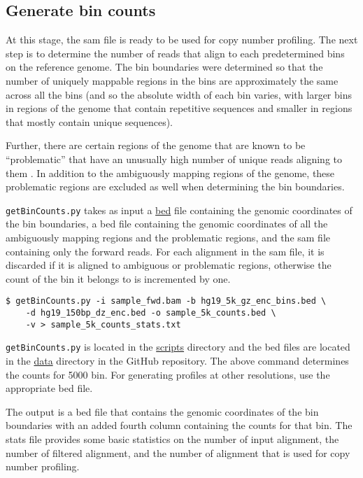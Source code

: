 \documentclass[11pt]{article}
\newcommand{\prog}[1]{\texttt{#1}}
\begin{document}
\subsection{Generate bin counts}
At this stage, the sam file is ready to be used for copy number
profiling.  The next step is to determine the number of reads that align
to each predetermined bins on the reference genome.
The bin boundaries were determined so that the number of uniquely
mappable regions in the bins are approximately the same across all the
bins (and so the absolute width of each bin varies, with larger bins in
regions of the genome that contain repetitive sequences and smaller in
regions that mostly contain unique sequences).

Further, there are certain regions of the genome that are known to be
``problematic'' that have an unusually high number of unique reads
aligning to them \citep{amemiya2019encode}. In addition to the ambiguously
mapping regions of the genome, these problematic regions are excluded as
well when determining the bin boundaries.

%
\prog{getBinCounts.py} takes as input a
\href{https://genome.ucsc.edu/FAQ/FAQformat.html#format1}{bed} file
containing the genomic coordinates of the bin boundaries, a bed file
containing the genomic coordinates of all the ambiguously mapping
regions and the problematic regions, and the sam file containing only
the forward reads. For each alignment in the sam file, it is discarded
if it is aligned to ambiguous or problematic regions, otherwise the
count of the bin it belongs to is incremented by one.
\begin{verbatim}
$ getBinCounts.py -i sample_fwd.bam -b hg19_5k_gz_enc_bins.bed \
    -d hg19_150bp_dz_enc.bed -o sample_5k_counts.bed \
    -v > sample_5k_counts_stats.txt
\end{verbatim}

\prog{getBinCounts.py} is located in the
\href{https://github.com/CSI-Cancer/CNVPipeline/tree/master/scripts}{scripts}
directory and the bed files are located in the
\href{https://github.com/CSI-Cancer/CNVPipeline/tree/master/data}{data}
directory in the GitHub repository. The above command determines the
counts for 5000 bin. For generating profiles at other resolutions, use
the appropriate bed file.

The output is a bed file that contains the genomic coordinates of the
bin boundaries with an added fourth column containing the counts for
that bin. The stats file provides some basic statistics on the number of
input alignment, the number of filtered alignment, and the number of
alignment that is used for copy number profiling.
\end{document}
